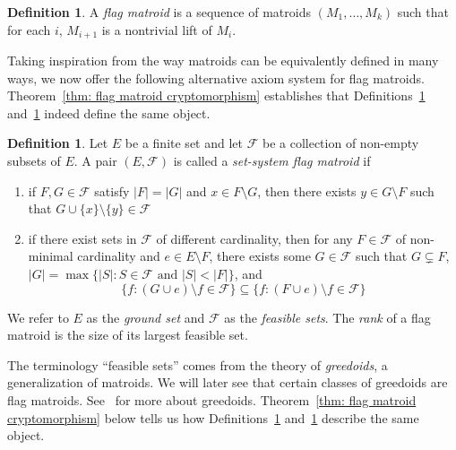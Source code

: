 \documentclass[12pt]{article}
\theoremstyle{definition}
\newtheorem{defn}[thm]{Definition}
\newtheorem{definition}[thm]{Definition}
\begin{document}
\begin{defn}\label{defn: lifts and flags}
    A \emph{flag matroid} is a sequence of matroids $(M_1,\dots,M_k)$ such that for each $i$, $M_{i+1}$ is a nontrivial lift of $M_i$.
\end{defn}

Taking inspiration from the way matroids can be equivalently defined in many ways,
we now offer the following alternative axiom system for flag matroids.
Theorem~\ref{thm: flag matroid cryptomorphism} establishes that Definitions~\ref{defn: lifts and flags} and~\ref{defn: flag matroid cryptomorphism} indeed define the same object. 

\begin{definition}\label{defn: flag matroid cryptomorphism}
     Let $E$ be a finite set and let $\mathcal{F}$ be a collection of non-empty subsets of $E$.  A pair $(E, \mathcal{F})$ is called a \emph{set-system flag matroid} if
     \begin{enumerate}
         \item if $F,G \in \mathcal{F}$ satisfy $|F| = |G|$ and $x \in F \setminus G$,
        then there exists $y \in G \setminus F$ such that $G \cup \{x\} \setminus \{y\} \in \mathcal{F}$ 
        \item if there exist sets in $\mathcal{F}$ of different cardinality, then for any $F \in \mathcal{F}$ of non-minimal cardinality and $e \in E\setminus F$, there exists some $G \in \mathcal{F}$ such that $G \subsetneq F$, $|G| = \max\{|S| : S\in \mathcal{F} \text{ and } |S| < |F|\}$, and
        \begin{equation*}
            \{f : (G\cup e)\setminus f \in \mathcal{F}\} \subseteq \{f : (F\cup e)\setminus f \in \mathcal{F}\}
        \end{equation*}
     \end{enumerate}
     We refer to $E$ as the \emph{ground set} and $\mathcal{F}$ as the \emph{feasible sets}.
     The \emph{rank} of a flag matroid is the size of its largest feasible set.
\end{definition}

The terminology ``feasible sets'' comes from the theory of \emph{greedoids}, a generalization of matroids. We will later see that certain classes of greedoids are flag matroids. See~\cite{greedoids} for more about greedoids.
Theorem~\ref{thm: flag matroid cryptomorphism} below tells us how
Definitions~\ref{defn: lifts and flags} and~\ref{defn: flag matroid cryptomorphism} describe the same object.
\end{document}
